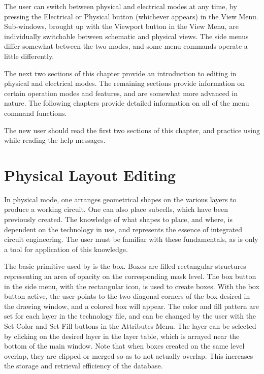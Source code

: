 The user can switch between physical and electrical modes at any time,
by pressing the {\cb Electrical} or {\cb Physical} button (whichever
appears) in the {\cb View Menu}.  Sub-windows, brought up with the {\cb
Viewport} button in the {\cb View Menu}, are individually switchable
between schematic and physical views.  The side menus differ somewhat
between the two modes, and some menu commands operate a little
differently.

The next two sections of this chapter provide an introduction to
editing in physical and electrical modes.  The remaining sections
provide information on certain {\Xic} operation modes and features,
and are somewhat more advanced in nature.  The following chapters
provide detailed information on all of the menu command functions.

The new user should read the first two sections of this chapter, and
practice using {\Xic} while reading the help messages.


\section{Physical Layout Editing}

In physical mode, one arranges geometrical shapes on the various
layers to produce a working circuit.  One can also place subcells,
which have been previously created.  The knowledge of what shapes to
place, and where, is dependent on the technology in use, and
represents the essence of integrated circuit engineering.  The user
must be familiar with these fundamentals, as {\Xic} is only a tool for
application of this knowledge.

The basic primitive used by {\Xic} is the box.  Boxes are filled
rectangular structures representing an area of opacity on the
corresponding mask level.  The {\cb box} button in the side menu, with
the rectangular icon, is used to create boxes.  With the {\cb box}
button active, the user points to the two diagonal corners of the box
desired in the drawing window, and a colored box will appear.  The
color and fill pattern are set for each layer in the technology file,
and can be changed by the user with the {\cb Set Color} and {\cb Set
Fill} buttons in the {\cb Attributes Menu}.  The layer can be selected
by clicking on the desired layer in the layer table, which is arrayed
near the bottom of the main {\Xic} window.  Note that when boxes
created on the same level overlap, they are clipped or merged so as to
not actually overlap.  This increases the storage and retrieval
efficiency of the database.

